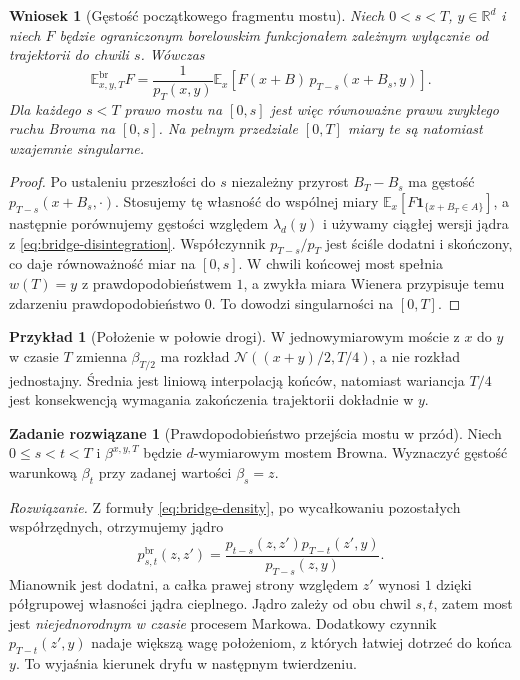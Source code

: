 \documentclass[11pt,a4paper,oneside]{report}
\numberwithin{equation}{chapter}
\theoremstyle{plain}
\newtheorem{wniosek}[twierdzenie]{Wniosek}
\theoremstyle{definition}
\newtheorem{przyklad}{Przykład}[chapter]
\newtheorem{zadanie}{Zadanie rozwiązane}[chapter]
\theoremstyle{remark}
\newcommand{\R}{\mathbb{R}}
\newcommand{\E}{\mathbb{E}}
\newcommand{\ind}[1]{\mathbf{1}_{#1}}
\newcommand{\Normal}{\mathcal{N}}
\begin{document}
\begin{wniosek}[Gęstość początkowego fragmentu mostu]\label{cor:volIII:15:01}
\label{cor:bridge-initial-density}
Niech $0<s<T$, $y\in\R^d$ i niech $F$ będzie
ograniczonym borelowskim funkcjonałem zależnym wyłącznie
od trajektorii do chwili $s$. Wówczas
\[
 \E_{x,y,T}^{\mathrm{br}}F
 =\frac{1}{p_T(x,y)}\E_x\left[
    F(x+B)\,p_{T-s}(x+B_s,y)\right].
\tag{15.3}\label{eq:bridge-likelihood}
\]
Dla każdego $s<T$ prawo mostu na $[0,s]$ jest więc
równoważne prawu zwykłego ruchu Browna na $[0,s]$.
Na pełnym przedziale $[0,T]$ miary te są natomiast
wzajemnie singularne.
\end{wniosek}
\begin{proof}
Po ustaleniu przeszłości do $s$ niezależny przyrost
$B_T-B_s$ ma gęstość $p_{T-s}(x+B_s,\cdot)$.
Stosujemy tę własność do wspólnej miary
$\E_x[F\ind{\{x+B_T\in A\}}]$, a następnie porównujemy
gęstości względem $\lambda_d(y)$ i używamy ciągłej wersji
jądra z \eqref{eq:bridge-disintegration}. Współczynnik
$p_{T-s}/p_T$ jest ściśle dodatni i skończony,
co daje równoważność miar na $[0,s]$.
W chwili końcowej most spełnia $w(T)=y$ z
prawdopodobieństwem $1$, a zwykła miara Wienera przypisuje
temu zdarzeniu prawdopodobieństwo $0$. To dowodzi
singularności na $[0,T]$.
\end{proof}

\begin{przyklad}[Położenie w połowie drogi]
W jednowymiarowym moście z $x$ do $y$ w czasie $T$
zmienna $\beta_{T/2}$ ma rozkład
$\Normal((x+y)/2,T/4)$, a nie rozkład jednostajny.
Średnia jest liniową interpolacją końców, natomiast
wariancja $T/4$ jest konsekwencją wymagania zakończenia
trajektorii dokładnie w $y$.
\end{przyklad}



\begin{zadanie}[Prawdopodobieństwo przejścia mostu w przód]
Niech $0\le s<t<T$ i $\beta^{x,y,T}$ będzie
$d$-wymiarowym mostem Browna. Wyznaczyć gęstość warunkową
$\beta_t$ przy zadanej wartości $\beta_s=z$.

\emph{Rozwiązanie.} Z formuły
\eqref{eq:bridge-density}, po wycałkowaniu pozostałych
współrzędnych, otrzymujemy jądro
\[
 p^{\mathrm{br}}_{s,t}(z,z')=
 \frac{p_{t-s}(z,z')p_{T-t}(z',y)}{p_{T-s}(z,y)}.
\]
Mianownik jest dodatni, a całka prawej strony względem
$z'$ wynosi $1$ dzięki półgrupowej własności jądra
cieplnego. Jądro zależy od obu chwil $s,t$, zatem most
jest \emph{niejednorodnym w czasie} procesem Markowa.
Dodatkowy czynnik $p_{T-t}(z',y)$ nadaje większą wagę
położeniom, z których łatwiej dotrzeć do końca $y$.
To wyjaśnia kierunek dryfu w następnym twierdzeniu.
\end{zadanie}
\end{document}
